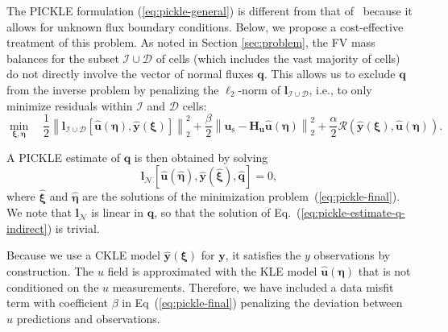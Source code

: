 \documentclass{agujournal2019}
\begin{document}
The PICKLE formulation (\ref{eq:pickle-general}) is different from that of~\cite{barajassolano-2019-pickle} because it allows for unknown flux boundary conditions.
Below, we propose a cost-effective treatment of this problem.  
As noted in Section \ref{sec:problem}, the FV mass balances for the subset $\mathcal{I} \cup \mathcal{D}$ of cells (which includes the vast majority of cells) do not directly involve the vector of normal fluxes $\mathbf{q}$.
This allows us to exclude $\mathbf{q}$ from the inverse problem by penalizing the $\ell_2$-norm of $\mathbf{l}_{\mathcal{I} \cup \mathcal{D}}$, i.e., to only minimize residuals within $\mathcal{I}$ and $\mathcal{D}$ cells:
%
\begin{equation}
  \label{eq:pickle-final}
  \min_{\bm{\xi}, \bm{\eta}} \quad \frac{1}{2} \left \| \mathbf{l}_{\mathcal{I} \cup \mathcal{D}} \left [ \hat{\mathbf{u}}(\bm{\eta}), \hat{\mathbf{y}}(\bm{\xi}) \right ] \right \|^2_2 + \frac{\beta}{2} \left \| \mathbf{u}_{\mathrm{s}} - \mathbf{H}_{\mathbf{u}} \hat{\mathbf{u}} (\bm{\eta}) \right \|^2_2 +
  \frac{\alpha}{2} \mathcal{R}(\hat{\mathbf{y}}(\boldsymbol{\xi}),\hat{\mathbf{u}}(\boldsymbol{\eta})).
\end{equation}


A PICKLE estimate of $\mathbf{q}$ is then obtained by solving
%  
\begin{equation}
  \label{eq:pickle-estimate-q-indirect}
  \mathbf{l}_{\mathcal{N}} \left[ \hat{\mathbf{u}}(\hat{\bm{\eta}}), \hat{\mathbf{y}}(\hat{\bm{\xi}}), \hat{\mathbf{q}} \right] = 0,
\end{equation}
where $\hat{\bm{\xi}}$ and $\hat{\bm{\eta}}$ are the solutions of the minimization problem~(\ref{eq:pickle-final}).
We note that $\mathbf{l}_{\mathcal{N}}$ is linear in $\mathbf{q}$, so that the solution of Eq.~(\ref{eq:pickle-estimate-q-indirect}) is trivial. 
  
Because we use a CKLE model $\hat{\mathbf{y}}(\bm{\xi})$ for $\mathbf{y}$, it satisfies the $y$ observations by construction.
The $u$ field is approximated with the KLE model $\hat{\mathbf{u}}(\bm{\eta})$ that is not conditioned on the $u$ measurements.
Therefore, we have included a data misfit term with coefficient $\beta$ in Eq~(\ref{eq:pickle-final}) penalizing the deviation between $u$ predictions and observations.
  
\end{document}
